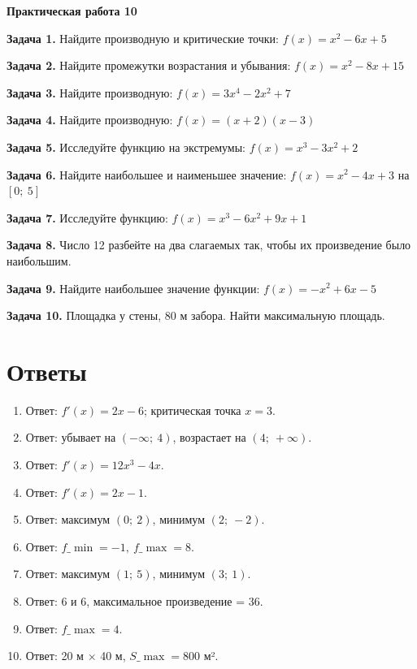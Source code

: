 \documentclass{umk-matematika}
\begin{document}
\begin{center}
{\Large\bfseries Практическая работа 10}
\end{center}
\vspace{0.5cm}

\textbf{Задача 1.} Найдите производную и критические точки: $f(x) = x^2 - 6x + 5$\par\vspace{10pt}
\textbf{Задача 2.} Найдите промежутки возрастания и убывания: $f(x) = x^2 - 8x + 15$\par\vspace{10pt}
\textbf{Задача 3.} Найдите производную: $f(x) = 3x^4 - 2x^2 + 7$\par\vspace{10pt}
\textbf{Задача 4.} Найдите производную: $f(x) = (x + 2)(x - 3)$\par\vspace{10pt}
\textbf{Задача 5.} Исследуйте функцию на экстремумы: $f(x) = x^3 - 3x^2 + 2$\par\vspace{10pt}
\textbf{Задача 6.} Найдите наибольшее и наименьшее значение: $f(x) = x^2 - 4x + 3$ на $[0;\ 5]$\par\vspace{10pt}
\textbf{Задача 7.} Исследуйте функцию: $f(x) = x^3 - 6x^2 + 9x + 1$\par\vspace{10pt}
\textbf{Задача 8.} Число 12 разбейте на два слагаемых так, чтобы их произведение было наибольшим.\par\vspace{10pt}
\textbf{Задача 9.} Найдите наибольшее значение функции: $f(x) = -x^2 + 6x - 5$\par\vspace{10pt}
\textbf{Задача 10.} Площадка у стены, 80 м забора. Найти максимальную площадь.\par\vspace{10pt}
\newpage
\section*{Ответы}

\begin{enumerate}
  \item Ответ: $f'(x) = 2x - 6$; критическая точка $x = 3$.
  \item Ответ: убывает на $(-\infty;\ 4)$, возрастает на $(4;\ +\infty)$.
  \item Ответ: $f'(x) = 12x^3 - 4x$.
  \item Ответ: $f'(x) = 2x - 1$.
  \item Ответ: максимум $(0;\ 2)$, минимум $(2;\ -2)$.
  \item Ответ: $f\_{\min} = -1,\ f\_{\max} = 8$.
  \item Ответ: максимум $(1;\ 5)$, минимум $(3;\ 1)$.
  \item Ответ: 6 и 6, максимальное произведение = 36.
  \item Ответ: $f\_{\max} = 4$.
  \item Ответ: 20 м $\times$ 40 м, $S\_{\max} = 800$ м².
\end{enumerate}
\end{document}
